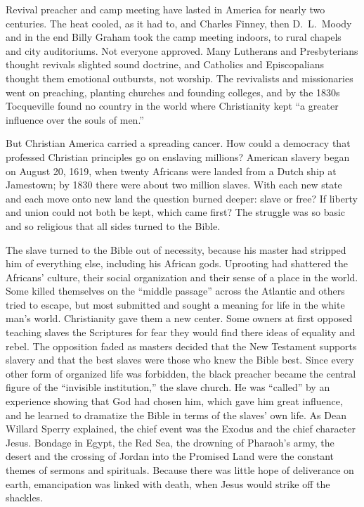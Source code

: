 Revival preacher and camp meeting have lasted in America for nearly two centuries. The heat cooled,
as it had to, and Charles Finney, then D.~L.~Moody and in the end Billy Graham took the camp meeting indoors, to rural chapels and city auditoriums. Not everyone approved. Many Lutherans and Presbyterians thought
revivals slighted sound doctrine, and Catholics and Episcopalians thought them emotional outbursts,
not worship. The revivalists and missionaries went on preaching, planting churches and founding
colleges, and by the 1830s Tocqueville found no country in the world where Christianity kept ``a
greater influence over the souls of men.''

But Christian America carried a spreading cancer. How could a democracy that professed Christian principles go on enslaving millions? American slavery began on August 20, 1619, when twenty Africans
were landed from a Dutch ship at Jamestown; by 1830 there were about two million slaves. With each
new state and each move onto new land the question burned deeper: slave or free? If liberty and union
could not both be kept, which came first? The struggle was so basic and so religious that all sides
turned to the Bible.

The slave turned to the Bible out of necessity, because his master had stripped him of everything
else, including his African gods. Uprooting had shattered the Africans' culture, their social
organization and their sense of a place in the world. Some killed themselves on the ``middle
passage'' across the Atlantic and others tried to escape, but most submitted and sought a meaning for
life in the white man's world. Christianity gave them a new center. Some owners at first opposed
teaching slaves the Scriptures for fear they would find there ideas of equality and rebel. The
opposition faded as masters decided that the New Testament supports slavery and that the best slaves
were those who knew the Bible best. Since every other form of organized life was forbidden, the black
preacher became the central figure of the ``invisible institution,'' the slave church. He was
``called'' by an experience showing that God had chosen him, which gave him great influence, and he
learned to dramatize the Bible in terms of the slaves' own life. As Dean Willard Sperry explained,
the chief event was the Exodus and the chief character Jesus. Bondage in Egypt, the Red Sea, the
drowning of Pharaoh's army, the desert and the crossing of Jordan into the Promised Land were the
constant themes of sermons and spirituals. Because there was little hope of deliverance on earth,
emancipation was linked with death, when Jesus would strike off the shackles.

